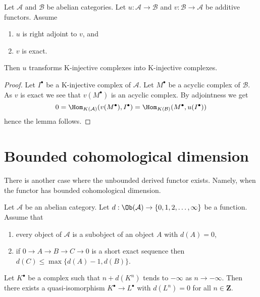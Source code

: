 \begin{lemma}
\label{lemma-adjoint-preserve-K-injectives}
Let $\mathcal{A}$ and $\mathcal{B}$ be abelian categories.
Let $u : \mathcal{A} \to \mathcal{B}$ and
$v : \mathcal{B} \to \mathcal{A}$ be additive functors. Assume
\begin{enumerate}
\item $u$ is right adjoint to $v$, and
\item $v$ is exact.
\end{enumerate}
Then $u$ transforms K-injective complexes into K-injective complexes.
\end{lemma}

\begin{proof}
Let $I^\bullet$ be a K-injective complex of $\mathcal{A}$.
Let $M^\bullet$ be a acyclic complex of $\mathcal{B}$.
As $v$ is exact we see that $v(M^\bullet)$ is an acyclic complex.
By adjointness we get
$$
0 = \Hom_{K(\mathcal{A})}(v(M^\bullet), I^\bullet) =
\Hom_{K(\mathcal{B})}(M^\bullet, u(I^\bullet))
$$
hence the lemma follows.
\end{proof}





\section{Bounded cohomological dimension}
\label{section-bounded}

\noindent
There is another case where the unbounded derived functor exists.
Namely, when the functor has bounded cohomological dimension.

\begin{lemma}
\label{lemma-replace-resolution}
Let $\mathcal{A}$ be an abelian category. Let
$d : \Ob(\mathcal{A}) \to \{0, 1, 2, \ldots, \infty\}$ be a function.
Assume that
\begin{enumerate}
\item every object of $\mathcal{A}$ is a subobject of an
object $A$ with $d(A) = 0$,
\item if $0 \to A \to B \to C \to 0$ is a short exact sequence
then $d(C) \leq \max\{d(A) - 1, d(B)\}$.
\end{enumerate}
Let $K^\bullet$ be a complex such that $n + d(K^n)$ tends to $-\infty$
as $n \to -\infty$. Then there exists a quasi-isomorphism
$K^\bullet \to L^\bullet$ with $d(L^n) = 0$ for all $n \in \mathbf{Z}$.
\end{lemma}

